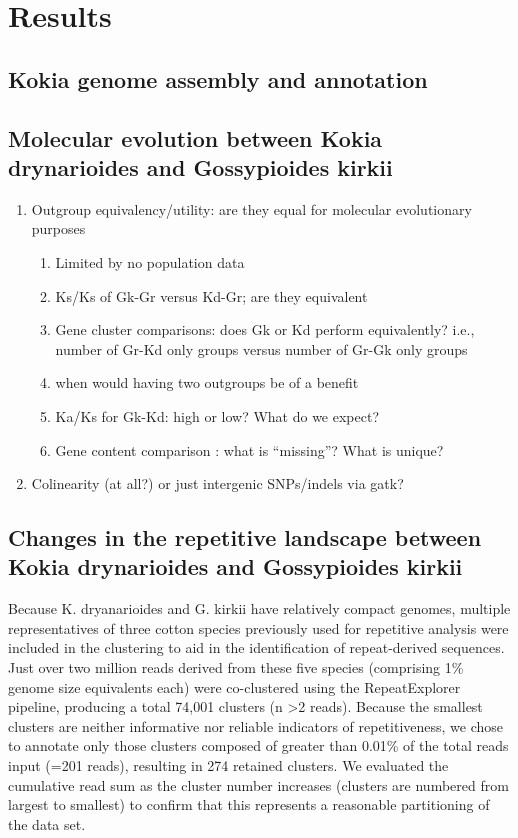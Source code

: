 \documentclass[10pt,letterpaper]{article}
\newcommand{\note}[2][]{\added[id=#1,remark={#2}]{}}
\begin{document}
\section*{Results}

\subsection*{Kokia genome assembly and annotation}


\subsection*{Molecular evolution between Kokia drynarioides and Gossypioides
  kirkii}

\begin{enumerate}
\item Outgroup equivalency/utility: are they equal for molecular evolutionary purposes
  \begin{enumerate}
  \item Limited by no population data
  \item Ks/Ks of Gk-Gr versus Kd-Gr; are they equivalent
  \item Gene cluster comparisons: does Gk or Kd perform equivalently? i.e.,
    number of Gr-Kd only groups versus number of Gr-Gk only groups
  \item when would having two outgroups be of a benefit
  \item Ka/Ks for Gk-Kd: high or low? What do we expect?
  \item Gene content comparison : what is “missing”? What is unique?
  \end{enumerate}
\item Colinearity (at all?) or just intergenic SNPs/indels via gatk?
\end{enumerate}

\subsection*{Changes in the repetitive landscape between Kokia drynarioides and
  Gossypioides kirkii}

Because K. dryanarioides and G. kirkii have relatively compact genomes, multiple
representatives of three cotton species previously used for repetitive analysis
\cite{Renny-Byfield2016} were included in the clustering to aid in the
identification of repeat-derived sequences. Just over two million reads derived
from these five species (comprising 1\% genome size equivalents each) were
co-clustered using the RepeatExplorer pipeline, producing a total 74,001
clusters (n >2 reads). Because the smallest clusters are neither informative nor
reliable indicators of repetitiveness, we chose to annotate only those clusters
composed of greater than 0.01\% of the total reads input (=201 reads), resulting
in 274 retained clusters. We evaluated the cumulative read sum as the cluster
number increases (clusters are numbered from largest to smallest) to confirm
that this represents a reasonable partitioning of the data set.
\note{cotton\_cutoff.png}
\end{document}
